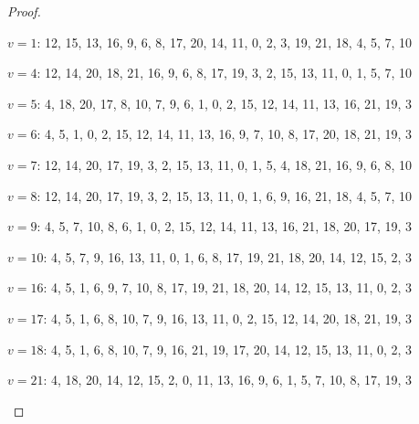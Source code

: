 \documentclass{amcjoucc}
\begin{document}
\begin{proof}
\begin{itemize}
{\footnotesize
\item $v = 1$: 12, 15, 13, 16, 9, 6, 8, 17, 20, 14, 11, 0, 2, 3, 19, 21, 18, 4, 5, 7, 10
\item $v = 4$: 12, 14, 20, 18, 21, 16, 9, 6, 8, 17, 19, 3, 2, 15, 13, 11, 0, 1, 5, 7, 10
\item $v = 5$: 4, 18, 20, 17, 8, 10, 7, 9, 6, 1, 0, 2, 15, 12, 14, 11, 13, 16, 21, 19, 3
\item $v = 6$: 4, 5, 1, 0, 2, 15, 12, 14, 11, 13, 16, 9, 7, 10, 8, 17, 20, 18, 21, 19, 3
\item $v = 7$: 12, 14, 20, 17, 19, 3, 2, 15, 13, 11, 0, 1, 5, 4, 18, 21, 16, 9, 6, 8, 10
\item $v = 8$: 12, 14, 20, 17, 19, 3, 2, 15, 13, 11, 0, 1, 6, 9, 16, 21, 18, 4, 5, 7, 10
\item $v = 9$: 4, 5, 7, 10, 8, 6, 1, 0, 2, 15, 12, 14, 11, 13, 16, 21, 18, 20, 17, 19, 3
\item $v = 10$: 4, 5, 7, 9, 16, 13, 11, 0, 1, 6, 8, 17, 19, 21, 18, 20, 14, 12, 15, 2, 3
\item $v = 16$: 4, 5, 1, 6, 9, 7, 10, 8, 17, 19, 21, 18, 20, 14, 12, 15, 13, 11, 0, 2, 3
\item $v = 17$: 4, 5, 1, 6, 8, 10, 7, 9, 16, 13, 11, 0, 2, 15, 12, 14, 20, 18, 21, 19, 3
\item $v = 18$: 4, 5, 1, 6, 8, 10, 7, 9, 16, 21, 19, 17, 20, 14, 12, 15, 13, 11, 0, 2, 3
\item $v = 21$: 4, 18, 20, 14, 12, 15, 2, 0, 11, 13, 16, 9, 6, 1, 5, 7, 10, 8, 17, 19, 3
}
\end{itemize}
\end{proof}
\end{document}
